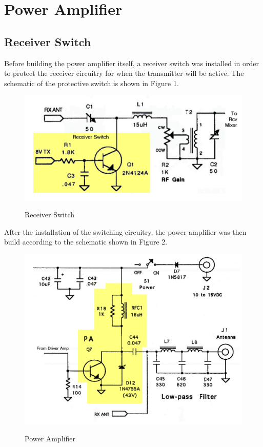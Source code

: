 \section{Power Amplifier}

\subsection{Receiver Switch}
Before building the power amplifier itself, a receiver switch was 
installed in order
to protect the receiver circuitry for when the transmitter will be active. 
The schematic of the protective switch is shown in
Figure 1.

\begin{figure}[h!]
  \centering
  \includegraphics[scale=0.6]{./img/RxSwitch.png}
  \label{fig:RxSwitch}
  \caption{Receiver Switch}
\end{figure}

After the installation of the switching circuitry, the power amplifier was then
build according to the schematic shown in Figure 2.

\begin{figure}[h!]
  \centering
  \includegraphics[scale=0.5]{./img/powamp.png}
  \label{fig:powamp}
  \caption{Power Amplifier}
\end{figure}


